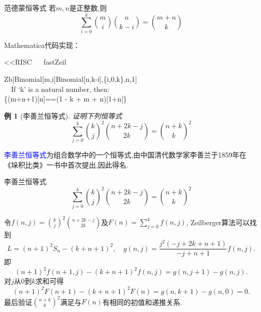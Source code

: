 \documentclass[punct]{ctexbeamer}
\newtheorem{ex}{例}[section]
\newcommand{\blue}{\textcolor{blue}}
\begin{document}
 \begin{frame}

        \begin{block}{范德蒙恒等式}
         若$m,n$是正整数,则
         $$
         \sum_{i=0}^{k}
         \binom{m}{i}
         \binom{n}{k-i} = \binom{m+n}{k}$$
     \end{block}
     Mathematica代码实现：
     \begin{mma}
         \In <<RISC ~\grave{ } \, fastZeil~\grave{}
         \linebreak
         \linebreak
         \linebreak
         \linebreak
         \\
     \end{mma}

     \begin{mma}
         \In Zb[Binomial[m,i]Binomial[n,k-i],\{i,0,k\},n,1] \\
         \, \, If `k' is a natural number, then:\\
         \Out \{(m+n+1)[n]==(1 - k + m + n)[1+n]\}\\
     \end{mma}
 \end{frame}

\begin{frame}
 \begin{ex}[李善兰恒等式]
    证明下列恒等式
    \begin{equation*}
        \sum_{j=0}^{k}\binom{k}{j}^{2}\binom{n+2k-j}{2k} = \binom{n+k}{k}^{2}
    \end{equation*}
\end{ex}
\blue{李善兰恒等式}为组合数学中的一个恒等式,由中国清代数学家李善兰于1859年在《垛积比类》一书中首次提出,因此得名.
\end{frame}




\begin{frame}
    \begin{block}{李善兰恒等式}
        \begin{equation*}
            \sum_{j=0}^{k}\binom{k}{j}^{2}\binom{n+2k-j}{2k} = \binom{n+k}{k}^{2}
        \end{equation*}
    \end{block}


    令$f(n,j)=\binom{k}{j}^2\binom{n+2k-j}{2k}$及$F(n)=\sum_{j=0}^{k}f(n,j)$,
    Zeilberger算法可以找到
    $$L=(n+1)^2 S_n-(k+n+1)^2, \quad g(n,j)=\frac{j^2 (-j+2 k+n+1)}{-j+n+1}f(n,j).$$
    即
    $$(n+1)^2f(n+1,j)-(k+n+1)^2f(n,j)=g(n,j+1)-g(n,j).$$
    对$j$从$0$到$k$求和可得
    $$(n+1)^2 F(n+1)-(k+n+1)^2 F(n)=g(n,k+1)-g(n,0)=0.$$
    最后验证$\binom{n+k}{k}^2$满足与$F(n)$有相同的初值和递推关系.
\end{frame}
\end{document}
